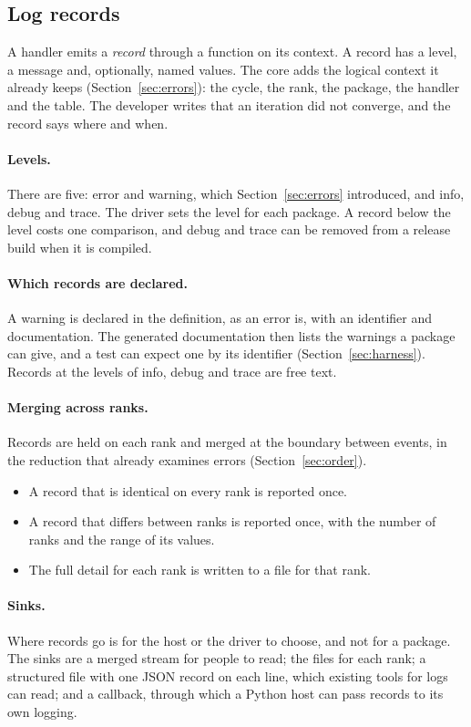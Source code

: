 \documentclass[11pt,a4paper]{article}
\begin{document}
\subsection{Log records}

A handler emits a \emph{record} through a function on its context.  A
record has a level, a message and, optionally, named values.  The core adds
the logical context it already keeps (Section~\ref{sec:errors}): the cycle,
the rank, the package, the handler and the table.  The developer writes
that an iteration did not converge, and the record says where and when.

\paragraph{Levels.}  There are five: error and warning, which
Section~\ref{sec:errors} introduced, and info, debug and trace.  The driver
sets the level for each package.  A record below the level costs one
comparison, and debug and trace can be removed from a release build when it
is compiled.

\paragraph{Which records are declared.}  A warning is declared in the
definition, as an error is, with an identifier and documentation.  The
generated documentation then lists the warnings a package can give, and a
test can expect one by its identifier (Section~\ref{sec:harness}).  Records
at the levels of info, debug and trace are free text.

\paragraph{Merging across ranks.}  Records are held on each rank and merged
at the boundary between events, in the reduction that already examines
errors (Section~\ref{sec:order}).

\begin{itemize}
  \item A record that is identical on every rank is reported once.
  \item A record that differs between ranks is reported once, with the
        number of ranks and the range of its values.
  \item The full detail for each rank is written to a file for that rank.
\end{itemize}

\paragraph{Sinks.}  Where records go is for the host or the driver to
choose, and not for a package.  The sinks are a merged stream for people to
read; the files for each rank; a structured file with one JSON record on
each line, which existing tools for logs can read; and a callback, through
which a Python host can pass records to its own logging.
\end{document}
